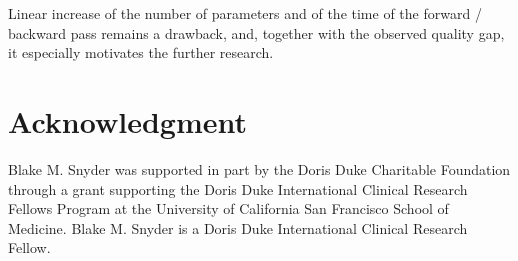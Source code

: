 \documentclass{llncs}
\begin{document}
Linear increase of the number of parameters and of the time of the forward / backward pass remains a drawback, and, together with the observed quality gap, it especially motivates the further research. %


\section*{Acknowledgment}


Blake M. Snyder was supported in part by the Doris Duke Charitable Foundation through a grant supporting the Doris Duke International Clinical Research Fellows Program at the University of California San Francisco School of Medicine.  Blake M. Snyder is a Doris Duke International Clinical Research Fellow. 



\end{document}
